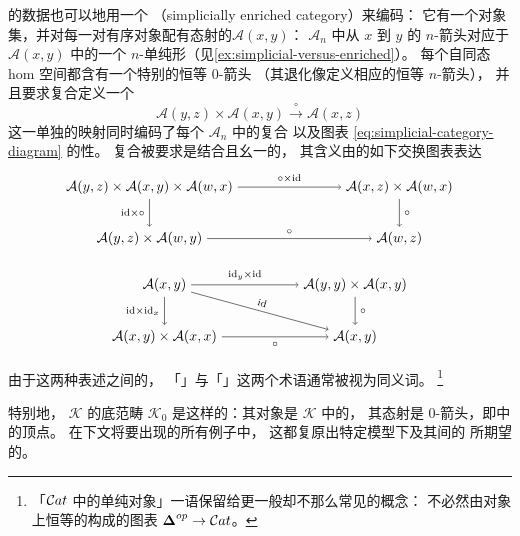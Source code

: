 \begin{digression}[\trSimplicialCategory{}，附录 A.2]
\trSimplicialCategory{}的数据也可以\trEquivalence{}地用一个\textbf{\trSimpliciallyEnrichedCategory}
（simplicially enriched category）来编码：
它有一个对象集，并对每一对有序对象配有态射的\trSimplicialSet $\mathcal{A}(x,y)$：
$\mathcal{A}_n$ 中从 $x$ 到 $y$ 的 $n$-箭头对应于
$\mathcal{A}(x,y)$ 中的一个 $n$-单纯形（见\cref{ex:simplicial-versus-enriched}）。
每个自同态 hom 空间都含有一个特别的恒等 $0$-箭头
（其退化像定义相应的恒等 $n$-箭头），
并且要求复合定义一个\trSimplicialMap
\begin{equation*}
\mathcal{A}(y,z)\times\mathcal{A}(x,y)
\xrightarrow{\ \circ\ }\mathcal{A}(x,z)
\end{equation*}
这一单独的映射同时编码了每个\trCategory{} $\mathcal{A}_n$ 中的复合
以及图表 \eqref{eq:simplicial-category-diagram} 的\trFunctor{}性。
复合被要求是结合且幺一的，
其含义由\trSimplicialSet{}的如下交换图表表达
\begin{equation*}
\begin{tikzpicture}[xscale=1.5,yscale=1.3]
\node (TL) at (0,1) {$\mathcal{A}(y,z)\times\mathcal{A}(x,y)\times\mathcal{A}(w,x)$};
\node (TR) at (4.2,1) {$\mathcal{A}(x,z)\times\mathcal{A}(w,x)$};
\node (BL) at (0,0) {$\mathcal{A}(y,z)\times\mathcal{A}(w,y)$};
\node (BR) at (4.2,0) {$\mathcal{A}(w,z)$};
\draw[->] (TL) -- (TR) node[midway,above]{$\scriptstyle\circ\times\mathrm{id}$};
\draw[->] (TL) -- (BL) node[midway,left]{$\scriptstyle\mathrm{id}\times\circ$};
\draw[->] (TR) -- (BR) node[midway,right]{$\scriptstyle\circ$};
\draw[->] (BL) -- (BR) node[midway,above]{$\scriptstyle\circ$};
\end{tikzpicture}
\end{equation*}
\begin{equation*}
\begin{tikzpicture}[xscale=1.5,yscale=1.3]
\node (TL) at (0,1) {$\mathcal{A}(x,y)$};
\node (TR) at (3.2,1) {$\mathcal{A}(y,y)\times\mathcal{A}(x,y)$};
\node (BL) at (0,0) {$\mathcal{A}(x,y)\times\mathcal{A}(x,x)$};
\node (BR) at (3.2,0) {$\mathcal{A}(x,y)$};
\draw[->] (TL) -- (TR) node[midway,above]{$\scriptstyle\mathrm{id}_y\times\mathrm{id}$};
\draw[->] (TL) -- (BL) node[midway,left]{$\scriptstyle\mathrm{id}\times\mathrm{id}_x$};
\draw[->] (TL) -- (BR) node[midway,above,sloped]{$\scriptstyle\mathrm{id}$};
\draw[->] (TR) -- (BR) node[midway,right]{$\scriptstyle\circ$};
\draw[->] (BL) -- (BR) node[midway,below]{$\scriptstyle\circ$};
\end{tikzpicture}
\end{equation*}
由于这两种表述之间的\trEquivalence{}，
「\trSimplicialCategory」与「\trSimpliciallyEnrichedCategory」这两个术语通常被视为同义词。
\footnote{「$\mathcal{C}at$ 中的单纯对象」一语保留给更一般却不那么常见的概念：
不必然由对象上恒等的\trFunctor{}构成的图表
$\boldsymbol{\Delta}^{op}\to\mathcal{C}at$。}

特别地，\trInfinityCosmos{} $\mathcal{K}$ 的底范畴 $\mathcal{K}_0$
是这样的\trCategory{}：其对象是 $\mathcal{K}$ 中的\trInfinityCategory{}，
其态射是 $0$-箭头，即\trFunctorSpace{}中的顶点。
在下文将要出现的所有例子中，
这都复原出特定模型下\trInfinityCategory{}及其间\trFunctor{}的
所期望的\trCategory{}。
\end{digression}

